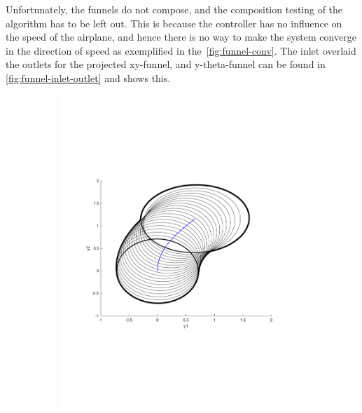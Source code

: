 Unfortunately, the funnels do not compose, and the composition testing of the
algorithm has to be left out. This is because the controller has no influence on
the speed of the airplane, and hence there is no way to make the system converge
in the direction of speed as exemplified in the~\cref{fig:funnel-conv}. The
inlet overlaid the outlets for the projected xy-funnel, and y-theta-funnel can
be found in \cref{fig:funnel-inlet-outlet} and shows this.

\begin{figure}
  \centering
  \begin{subfigure}[b]{0.4\textwidth}
    \includegraphics[width=\textwidth]{figures/experiments/sos-calculation}
  \end{subfigure}
  \quad
  \begin{subfigure}[b]{0.4\textwidth}

\end{subfigure}
\end{figure}
